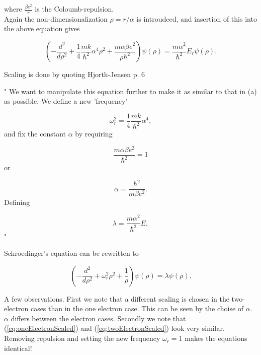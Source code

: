 \documentclass{article}
\begin{document}
where $\frac{\beta e^2}{r}$ is the Coloumb-repulsion.\\

Again the non-dimensionalization $\rho = r/\alpha$ is introudced, and insertion of this into the above equation gives

\begin{equation}\label{eq:twoElectronIntermediate}
\left(-\frac{d^2}{d\rho^2} 
+ \frac{1}{4}\frac{mk}{\hbar^2} \alpha^4\rho^2+\frac{m\alpha \beta e^2}{\rho\hbar^2}\right)\psi(\rho)    = 
\frac{m\alpha^2}{\hbar^2}E_r \psi(\rho) .
\end{equation}

Scaling is done by quoting Hjorth-Jensen \cite{MHJProject2}  p. 6 

"
We want to manipulate this equation further to make it as similar to that in (a)
as possible. We define a new 'frequency'

\begin{equation*}
\omega_r^2=\frac{1}{4}\frac{mk}{\hbar^2} \alpha^4,
\end{equation*}
and fix the constant $\alpha$ by requiring

\begin{equation*}
\frac{m\alpha \beta e^2}{\hbar^2}=1
\end{equation*}
or

\begin{equation*}
\alpha = \frac{\hbar^2}{m\beta e^2}.
\end{equation*}
Defining

\begin{equation*}
\lambda = \frac{m\alpha^2}{\hbar^2}E,
\end{equation*}"

Schroedinger's equation can be rewritten to

\begin{equation}\label{eq:twoElectronScaled}
\left(-\frac{d^2}{d\rho^2} + \omega_r^2\rho^2 +\frac{1}{\rho}\right)\psi(\rho) = \lambda \psi(\rho).
\end{equation}


A few observations. First we note that a different scaling is chosen in the two-electron cases than in the one electron case. This can be seen by the choise of $\alpha$. $\alpha$ differs between the electron cases. Secondly we note that (\ref{eq:oneElectronScaled}) and (\ref{eq:twoElectronScaled}) look very similar. Removing repulsion and setting the new frequency $\omega_r=1$ makes the equations identical!\\
\end{document}
